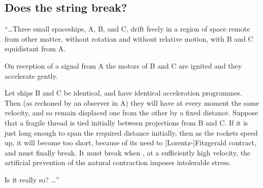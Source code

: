 \subsection{Does the string break?}
	``\ldots Three small spaceships, A, B, and C, drift freely in a region of space remote from other 
	matter, without rotation and without relative motion, with B and C equidistant from A.
	
	On reception of a signal from A the motors of B and C are ignited and they accelerate gently.

	Let ships B and C be identical, and have identical acceleration programmes. Then (as reckoned
	by an observer in A) they will have at every moment the same velocity, and so remain 
	displaced one from the other by a fixed distance. Suppose that a fragile thread is tied 
	initially between projections from B and C. If it is just long enough to span the required
	distance initially, then as the rockets speed up, it will become too short, because of its 
	need to [Lorentz-]Fitzgerald contract, and must finally break. It must break when , at a 
	sufficiently high velocity, the artificial prevention of the natural contraction imposes 
	intolerable stress. 

	Is it really so? \ldots	''\\
